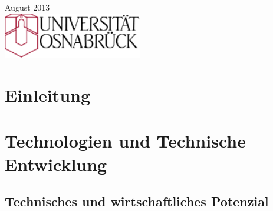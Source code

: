 \documentclass[12pt]{article}
\begin{document}
\begin{titlepage}


{\large August 2013}\\[3cm] %


\includegraphics[height=2cm]{unilogo.png}
 

\vfill %

\end{titlepage}

\tableofcontents
\newpage

\section{Einleitung}


\section{Technologien und Technische Entwicklung}


\subsection{Technisches und wirtschaftliches Potenzial}

\end{document}

